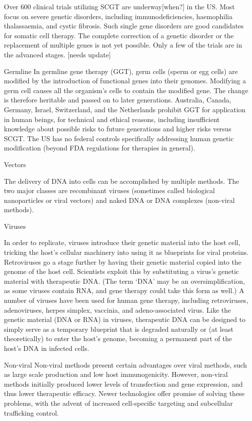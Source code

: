 Over 600 clinical trials utilizing SCGT are underway{[}when?{]} in the US. Most focus on severe genetic disorders, including immunodeficiencies, haemophilia thalassaemia, and cystic fibrosis. Such single gene disorders are good candidates for somatic cell therapy. The complete correction of a genetic disorder or the replacement of multiple genes is not yet possible. Only a few of the trials are in the advanced stages. {[}needs update{]}

Germline
In germline gene therapy (GGT), germ cells (sperm or egg cells) are modified by the introduction of functional genes into their genomes. Modifying a germ cell causes all the organism's cells to contain the modified gene. The change is therefore heritable and passed on to later generations. Australia, Canada, Germany, Israel, Switzerland, and the Netherlands prohibit GGT for application in human beings, for technical and ethical reasons, including insufficient knowledge about possible risks to future generations and higher risks versus SCGT. The US has no federal controls specifically addressing human genetic modification (beyond FDA regulations for therapies in general).

Vectors

The delivery of DNA into cells can be accomplished by multiple methods. The two major classes are recombinant viruses (sometimes called biological nanoparticles or viral vectors) and naked DNA or DNA complexes (non-viral methods).

Viruses

In order to replicate, viruses introduce their genetic material into the host cell, tricking the host's cellular machinery into using it as blueprints for viral proteins. Retroviruses go a stage further by having their genetic material copied into the genome of the host cell. Scientists exploit this by substituting a virus's genetic material with therapeutic DNA. (The term `DNA' may be an oversimplification, as some viruses contain RNA, and gene therapy could take this form as well.) A number of viruses have been used for human gene therapy, including retroviruses, adenoviruses, herpes simplex, vaccinia, and adeno-associated virus. Like the genetic material (DNA or RNA) in viruses, therapeutic DNA can be designed to simply serve as a temporary blueprint that is degraded naturally or (at least theoretically) to enter the host's genome, becoming a permanent part of the host's DNA in infected cells.

Non-viral
Non-viral methods present certain advantages over viral methods, such as large scale production and low host immunogenicity. However, non-viral methods initially produced lower levels of transfection and gene expression, and thus lower therapeutic efficacy. Newer technologies offer promise of solving these problems, with the advent of increased cell-specific targeting and subcellular trafficking control.

